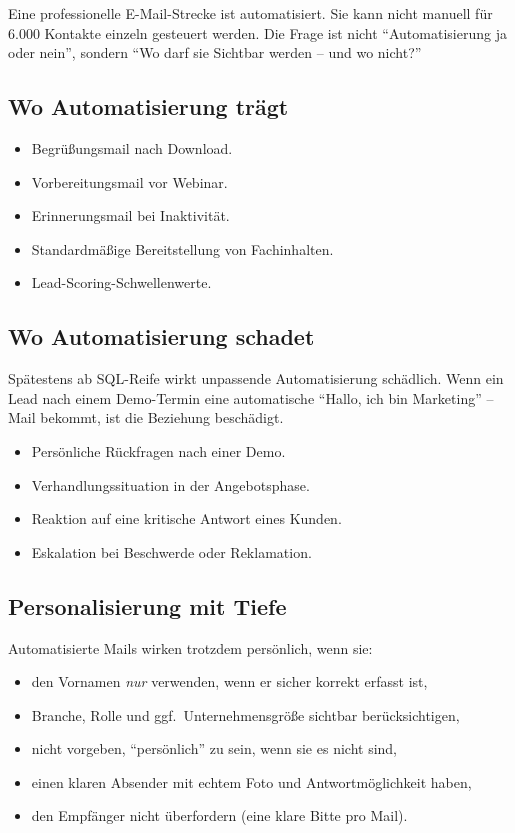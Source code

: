 \documentclass[11pt,a4paper,oneside]{article}
\begin{document}
Eine professionelle E-Mail-Strecke ist automatisiert. Sie kann nicht manuell für 6.000 Kontakte einzeln gesteuert werden. Die Frage ist nicht ``Automatisierung ja oder nein'', sondern ``Wo darf sie Sichtbar werden -- und wo nicht?''

\subsection{Wo Automatisierung trägt}

\begin{itemize}
  \item Begrüßungsmail nach Download.
  \item Vorbereitungsmail vor Webinar.
  \item Erinnerungsmail bei Inaktivität.
  \item Standardmäßige Bereitstellung von Fachinhalten.
  \item Lead-Scoring-Schwellenwerte.
\end{itemize}

\subsection{Wo Automatisierung schadet}

Spätestens ab SQL-Reife wirkt unpassende Automatisierung schädlich. Wenn ein Lead nach einem Demo-Termin eine automatische ``Hallo, ich bin Marketing'' -- Mail bekommt, ist die Beziehung beschädigt.

\begin{itemize}
  \item Persönliche Rückfragen nach einer Demo.
  \item Verhandlungssituation in der Angebotsphase.
  \item Reaktion auf eine kritische Antwort eines Kunden.
  \item Eskalation bei Beschwerde oder Reklamation.
\end{itemize}

\subsection{Personalisierung mit Tiefe}

Automatisierte Mails wirken trotzdem persönlich, wenn sie:
\begin{itemize}
  \item den Vornamen \emph{nur} verwenden, wenn er sicher korrekt erfasst ist,
  \item Branche, Rolle und ggf.\ Unternehmensgröße sichtbar berücksichtigen,
  \item nicht vorgeben, ``persönlich'' zu sein, wenn sie es nicht sind,
  \item einen klaren Absender mit echtem Foto und Antwortmöglichkeit haben,
  \item den Empfänger nicht überfordern (eine klare Bitte pro Mail).
\end{itemize}
\end{document}
